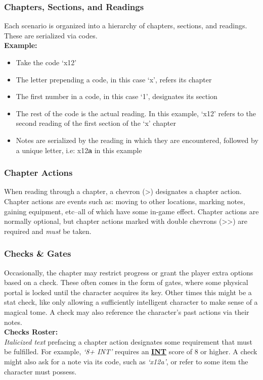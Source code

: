 \documentclass[12pt]{article}
\newcommand{\refto}[1]{\hyperlink{#1}{\textbf{#1}}}
\begin{document}
\begin{multicols*}{2}
\subsubsection{Chapters, Sections, and Readings}
Each scenario is organized into a hierarchy of chapters, sections, and readings. These are serialized via codes.\\
\textbf{Example:}
\begin{itemize}
\item Take the code ‘x12’
\item The letter prepending a code, in this case ‘x’, refers its chapter
\item The first number in a code, in this case ‘1’, designates its section
\item The rest of the code is the actual reading. In this example, ‘x12’ refers to the second reading of the first section of the ‘x’ chapter
\item Notes are serialized by the reading in which they are encountered, followed by a unique letter, i.e: x12\textbf{a} in this example
\end{itemize}

\columnbreak

\subsubsection{Chapter Actions}
When reading through a chapter, a chevron (>) designates a chapter action. Chapter actions are events such as: moving to other locations, marking notes, gaining equipment, etc--all of which have some in-game effect. Chapter actions are normally optional, but chapter actions marked with double chevrons (>>) are required and \emph{must} be taken.

\subsubsection{Checks \& Gates}
Occasionally, the chapter may restrict progress or grant the player extra options based on a check. These often comes in the form of gates, where some physical portal is locked until the character acquires its key. Other times this might be a stat check, like only allowing a sufficiently intelligent character to make sense of a magical tome. A check may also reference the character’s past actions via their notes.\\

\textbf{Checks Roster:}\\
\emph{Italicized text} prefacing a chapter action designates some requirement that must be fulfilled. For example, \emph{‘8+ INT’} requires an \refto{INT} score of 8 or higher. A check might also ask for a note via its code, such as \emph{‘x12a’}, or refer to some item the character must possess.\\


\end{multicols*}
\end{document}
